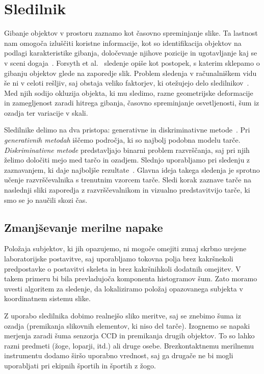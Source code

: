 \section{Sledilnik}
%
Gibanje objektov v prostoru zaznamo kot časovno spreminjanje slike. Ta lastnost nam omogoča izluščiti koristne informacije, kot so identifikacija objektov na podlagi karakteristike gibanja, določevanje njihove pozicije in ugotavljanje kaj se v sceni dogaja~\cite{forsyth2002computer}. Forsyth et al.~\cite{forsyth2002computer} sledenje opiše kot postopek, s katerim sklepamo o gibanju objektov glede na zaporedje slik. Problem sledenja v računalniškem vidu še ni v celoti rešljiv, saj obstaja veliko faktorjev, ki otežujejo delo sledilnikov~\cite{danelljan2014adaptive}. Med njih sodijo okluzija objekta, ki mu sledimo, razne geometrijske deformacije in zamegljenost zaradi hitrega gibanja, časovno spreminjanje osvetljenosti, šum iz ozadja ter variacije v skali. 

Sledilnike delimo na dva pristopa: generativne in diskriminativne metode~\cite{danelljan2014adaptive}. Pri \emph{generativnih metodah} iščemo področja, ki so najbolj podobna modelu tarče. \emph{Diskriminativne metode} predstavljajo binarni problem razvrščanja, saj pri njih želimo določiti mejo med tarčo in ozadjem. Slednjo uporabljamo pri sledenju z zaznavanjem, ki daje najboljše rezultate~\cite{danelljan2014adaptive}. Glavna ideja takega sledenja je sprotno učenje razvrščevalnika s trenutnim vzorcem tarče. Sledi korak zaznave tarče na naslednji sliki zaporedja z razvrščevalnikom in vizualno predstavitvijo tarče, ki smo se jo naučili skozi čas.






\subsection{Zmanjševanje merilne napake}

Položaja subjektov, ki jih opazujemo, ni mogoče omejiti zunaj skrbno urejene laboratorijske postavitve, saj uporabljamo tokovna polja brez kakršnekoli predpostavke o postavitvi skeleta in brez kakršnihkoli dodatnih omejitev. V takem primeru bi bila prevladujoča komponenta histogramov šum. Zato moramo uvesti algoritem za sledenje, da lokaliziramo položaj opazovanega subjekta v koordinatnem sistemu slike.

Z uporabo sledilnika dobimo realnejšo sliko meritve, saj se znebimo šuma iz ozadja (premikanja slikovnih elementov, ki niso del tarče). Izognemo se napaki merjenja zaradi šuma senzorja CCD in premikanja drugih objektov. To so lahko razni predmeti (žoge, loparji, itd.) ali druge osebe. Brezkontaktnemu merilnemu instrumentu dodamo širšo uporabno vrednost, saj ga drugače ne bi mogli uporabljati pri ekipnih športih in športih z žogo. 

